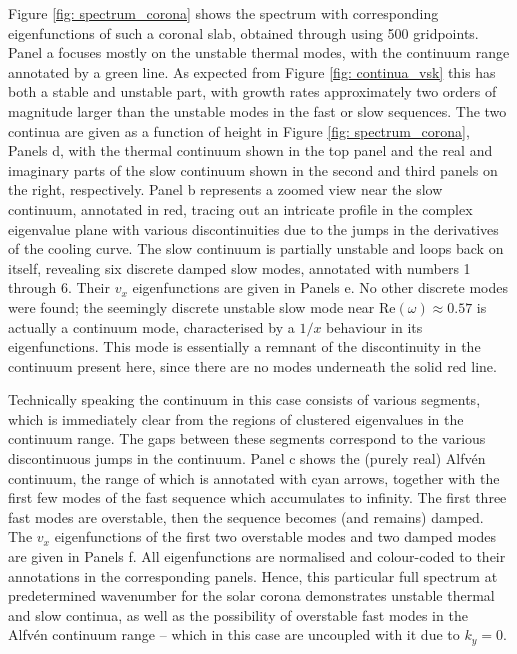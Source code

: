 Figure \ref{fig: spectrum_corona} shows the spectrum with corresponding eigenfunctions of such a coronal slab, obtained through {\legolas} using 500 gridpoints. Panel a focuses mostly on the unstable thermal modes, with the continuum range annotated by a green line. As expected from Figure \ref{fig: continua_vsk} this has both a stable and unstable part, with growth rates approximately two orders of magnitude larger than the unstable modes in the fast or slow sequences. The two continua are given as a function of height in Figure \ref{fig: spectrum_corona}, Panels d, with the thermal continuum shown in the top panel and the real and imaginary parts of the slow continuum shown in the second and third panels on the right, respectively. Panel b represents a zoomed view near the slow continuum, annotated in red, tracing out an intricate profile in the complex eigenvalue plane with various discontinuities due to the jumps in the derivatives of the cooling curve. The slow continuum is partially unstable and loops back on itself, revealing six discrete damped slow modes, annotated with numbers 1 through 6. Their $v_x$ eigenfunctions are given in Panels e. No other discrete modes were found; the seemingly discrete unstable slow mode near Re$(\omega) \approx 0.57$ is actually a continuum mode, characterised by a $1/x$ behaviour in its eigenfunctions. This mode is essentially a remnant of the discontinuity in the continuum present here, since there are no modes underneath the solid red line.

Technically speaking the continuum in this case consists of various segments, which is immediately clear from the regions of clustered eigenvalues in the continuum range. The gaps between these segments correspond to the various discontinuous jumps in the continuum. Panel c shows the (purely real) Alfv\'en continuum, the range of which is annotated with cyan arrows, together with the first few modes of the fast sequence which accumulates to infinity. The first three fast modes are overstable, then the sequence becomes (and remains) damped. The $v_x$ eigenfunctions of the first two overstable modes and two damped modes are given in Panels f. All eigenfunctions are normalised and colour-coded to their annotations in the corresponding panels. Hence, this particular full spectrum at predetermined wavenumber for the solar corona demonstrates unstable thermal and slow continua, as well as the possibility of overstable fast modes in the Alfv\'en continuum range -- which in this case are uncoupled with it due to $k_y = 0$.

